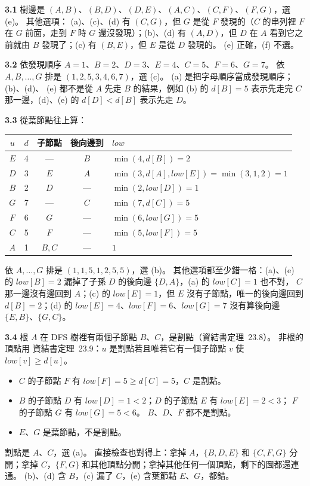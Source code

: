 \begin{pastsoln}
\textbf{3.1} 樹邊是 $(A, B)$、$(B, D)$、$(D, E)$、$(A, C)$、$(C, F)$、$(F, G)$，選 (e)。 其他選項：
(a)、(c)、(d) 有 $(C, G)$，但 $G$ 是從 $F$ 發現的（$C$ 的串列裡 $F$ 在 $G$ 前面，走到 $F$ 時 $G$
還沒發現）；(b)、(d) 有 $(A, D)$，但 $D$ 在 $A$ 看到它之前就由 $B$ 發現了；(c) 有 $(B, E)$，但
$E$ 是從 $D$ 發現的。 (e) 正確，(f) 不選。

\textbf{3.2} 依發現順序 $A = 1$、$B = 2$、$D = 3$、$E = 4$、$C = 5$、$F = 6$、$G = 7$。 依
$A, B, \ldots, G$ 排是 $(1, 2, 5, 3, 4, 6, 7)$，選 (c)。 (a) 是把字母順序當成發現順序；(b)、(d)、
(e) 都不是從 $A$ 先走 $B$ 的結果，例如 (b) 的 $d[B] = 5$ 表示先走完 $C$ 那一邊，(d)、(e) 的
$d[D] < d[B]$ 表示先走 $D$。

\textbf{3.3} 從葉節點往上算：

\begin{center}
\small
\begin{tabular}{ccccl}
\toprule
$u$ & $d$ & 子節點 & 後向邊到 & $\mathit{low}$ \\
\midrule
$E$ & 4 & — & $B$ & $\min(4, d[B]) = 2$ \\
$D$ & 3 & $E$ & $A$ & $\min(3, d[A], \mathit{low}[E]) = \min(3, 1, 2) = 1$ \\
$B$ & 2 & $D$ & — & $\min(2, \mathit{low}[D]) = 1$ \\
$G$ & 7 & — & $C$ & $\min(7, d[C]) = 5$ \\
$F$ & 6 & $G$ & — & $\min(6, \mathit{low}[G]) = 5$ \\
$C$ & 5 & $F$ & — & $\min(5, \mathit{low}[F]) = 5$ \\
$A$ & 1 & $B, C$ & — & $1$ \\
\bottomrule
\end{tabular}
\end{center}

依 $A, \ldots, G$ 排是 $(1, 1, 5, 1, 2, 5, 5)$，選 (b)。 其他選項都至少錯一格：(a)、(e) 的
$\mathit{low}[B] = 2$ 漏掉了子孫 $D$ 的後向邊 $\{D, A\}$，(a) 的 $\mathit{low}[C] = 1$ 也不對，
$C$ 那一邊沒有邊回到 $A$；(c) 的 $\mathit{low}[E] = 1$，但 $E$ 沒有子節點，唯一的後向邊回到
$d[B] = 2$；(d) 的 $\mathit{low}[E] = 4$、$\mathit{low}[F] = 6$、$\mathit{low}[G] = 7$ 沒有算後向邊
$\{E, B\}$、$\{G, C\}$。

\textbf{3.4} 根 $A$ 在 DFS 樹裡有兩個子節點 $B$、$C$，是割點（資結書定理~23.8）。 非根的頂點用
資結書定理~23.9：$u$ 是割點若且唯若它有一個子節點 $v$ 使 $\mathit{low}[v] \ge d[u]$。
\begin{itemize}
\item $C$ 的子節點 $F$ 有 $\mathit{low}[F] = 5 \ge d[C] = 5$，$C$ 是割點。
\item $B$ 的子節點 $D$ 有 $\mathit{low}[D] = 1 < 2$；$D$ 的子節點 $E$ 有 $\mathit{low}[E] = 2 < 3$；
$F$ 的子節點 $G$ 有 $\mathit{low}[G] = 5 < 6$。 $B$、$D$、$F$ 都不是割點。
\item $E$、$G$ 是葉節點，不是割點。
\end{itemize}
割點是 $A$、$C$，選 (a)。 直接檢查也對得上：拿掉 $A$，$\{B, D, E\}$ 和 $\{C, F, G\}$ 分開；拿掉
$C$，$\{F, G\}$ 和其他頂點分開；拿掉其他任何一個頂點，剩下的圖都還連通。 (b)、(d) 含 $B$，(c) 漏了
$C$，(e) 含葉節點 $E$、$G$，都錯。
\end{pastsoln}
